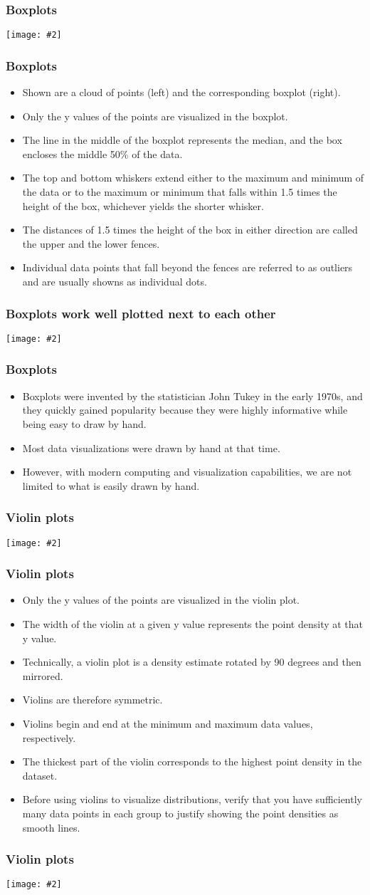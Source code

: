 \documentclass{beamer}
\newcommand{\bi}{\begin{itemize}}
\newcommand{\li}{\item}
\newcommand{\ei}{\end{itemize}}
\newcommand{\fig}[2]{\centerline{\texttt{[image: \#2]}}}
\newcommand{\bfr}[1]{\begin{frame}[fragile]\frametitle{{ #1 }}}
\begin{document}
\bfr{Boxplots}
\fig{1}{boxplot-schematic-1.png}
\end{frame}

\bfr{Boxplots}
\bi
\li Shown are a cloud of points (left) and the corresponding boxplot (right).
\li Only the y values of the points are visualized in the boxplot.
\li The line in the middle of the boxplot represents the median, and the box encloses the middle 50\% of the data.
\li The top and bottom whiskers extend either to the maximum and minimum of the data or to the maximum or minimum that falls within 1.5 times the height of the box, whichever yields the shorter whisker.
\li The distances of 1.5 times the height of the box in either direction are called the upper and the lower fences.
\li Individual data points that fall beyond the fences are referred to as outliers and are usually showns as individual dots.
\ei
\end{frame}

\bfr{Boxplots work well plotted next to each other}
\fig{1}{lincoln-temp-boxplots-1.png}
\end{frame}

\bfr{Boxplots}
\bi
\li Boxplots were invented by the statistician John Tukey in the early 1970s, and they quickly gained popularity because they were highly informative while being easy to draw by hand.
\li Most data visualizations were drawn by hand at that time.
\li However, with modern computing and visualization capabilities, we are not limited to what is easily drawn by hand. 
\ei
\end{frame}
\bfr{Violin plots}
\fig{1}{violin-schematic-1.png}
\end{frame}
\bfr{Violin plots}
\bi

\li Only the y values of the points are visualized in the violin plot.
\li The width of the violin at a given y value represents the point density at that y value.
\li Technically, a violin plot is a density estimate rotated by 90 degrees and then mirrored.
\li Violins are therefore symmetric.
\li Violins begin and end at the minimum and maximum data values, respectively.
\li The thickest part of the violin corresponds to the highest point density in the dataset.
\li
Before using violins to visualize distributions, verify that you have sufficiently many data points in each group to justify showing the point densities as smooth lines.
\ei
\end{frame}

\bfr{Violin plots}
\fig{1}{lincoln-temp-violins-1.png}
\end{frame}
\end{document}
